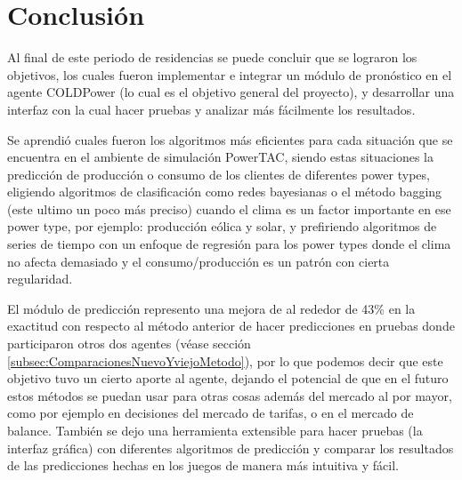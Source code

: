 \section{Conclusión}

Al final de este periodo de residencias se puede concluir que se lograron los objetivos, los cuales fueron implementar e integrar un módulo de pronóstico en el agente COLDPower (lo cual es el objetivo general del proyecto), y desarrollar una interfaz con la cual hacer pruebas y analizar más fácilmente los resultados. 

Se aprendió cuales fueron los algoritmos más eficientes para cada situación que se encuentra en el ambiente de simulación PowerTAC, siendo estas situaciones la predicción de producción o consumo de los clientes de diferentes power types,
eligiendo algoritmos de clasificación como redes bayesianas o el método bagging (este ultimo un poco más preciso) cuando el clima es un factor importante en ese power type, por ejemplo: producción eólica y solar, y prefiriendo algoritmos de series de tiempo con un enfoque de regresión para los power types donde el clima no afecta demasiado y el consumo/producción es un patrón con cierta regularidad.

El módulo de predicción represento una mejora de al rededor de 43\% en la exactitud con respecto al método anterior de hacer predicciones en pruebas donde participaron otros dos agentes (véase sección \ref{subsec:ComparacionesNuevoYviejoMetodo}), por lo que podemos decir que este objetivo tuvo un cierto aporte al agente, dejando el potencial de que en el futuro estos métodos se puedan usar para otras cosas además del mercado al por mayor, como por ejemplo en decisiones del mercado de tarifas, o en el mercado de balance. También se dejo una herramienta extensible para hacer pruebas (la interfaz gráfica) con diferentes algoritmos de predicción y comparar los resultados de las predicciones hechas en los juegos de manera más intuitiva y fácil.